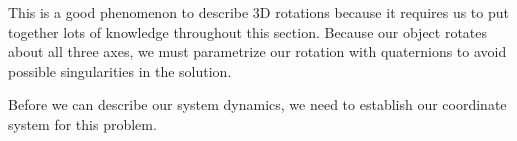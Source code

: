 \documentclass[12pt]{report}
\begin{document}
This is a good phenomenon to describe 3D rotations because it requires us to put together lots of knowledge throughout this section. Because our object rotates about all three axes, we must parametrize our rotation with \glspl{quaternion} to avoid possible singularities in the solution.

Before we can describe our system dynamics, we need to establish our coordinate system for this problem.

\begin{figure}[ht]
    \centering



\begin{tikzpicture}[x=0.75pt,y=0.75pt,yscale=-1,xscale=1]



\end{tikzpicture}
\end{figure}
\end{document}
